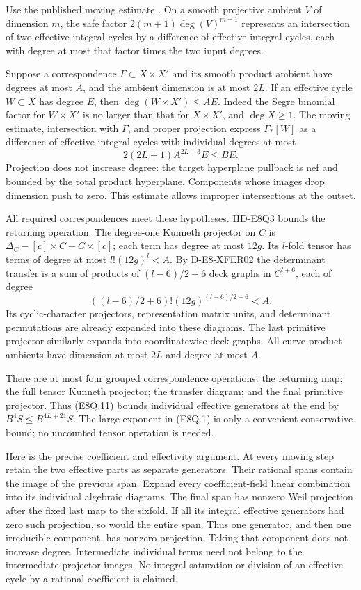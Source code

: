 Use the published moving estimate
\cite[Lemma~2.2, author-version p.~13]{Truong2020}.
On a smooth projective ambient \(V\) of dimension \(m\),
the safe factor \(2(m+1)\deg(V)^{m+1}\) represents an
intersection of two effective integral cycles by a
difference of effective integral cycles, each with degree
at most that factor times the two input degrees.

Suppose a correspondence \(\Gamma\subset X\times X'\)
and its smooth product ambient have degrees at most \(A\),
and the ambient dimension is at most \(2L\). If an effective
cycle \(W\subset X\) has degree \(E\), then
\(\deg(W\times X')\le AE\). Indeed the Segre binomial
factor for \(W\times X'\) is no larger than that for
\(X\times X'\), and \(\deg X\ge1\).
The moving estimate, intersection with \(\Gamma\), and
proper projection express \(\Gamma_*[W]\) as a difference
of effective integral cycles with individual degrees at most
\[
                  2(2L+1)A^{2L+3}E\le BE.                   \tag{E8Q.11}
\]
Projection does not increase degree: the target hyperplane
pullback is nef and bounded by the total product hyperplane.
Components whose images drop dimension push to zero.
This estimate allows improper intersections at the outset.

All required correspondences meet these hypotheses.
HD-E8Q3 bounds the returning operation. The degree-one
Kunneth projector on \(C\) is
\(\Delta_C-[c]\times C-C\times[c]\); each term has degree
at most \(12g\). Its \(l\)-fold tensor has terms of degree
at most \(l!(12g)^l<A\).
By D-E8-XFER02 the determinant transfer is a sum of products
of \((l-6)/2+6\) deck graphs in \(C^{l+6}\), each of degree
\[
           ((l-6)/2+6)!(12g)^{(l-6)/2+6}<A.                  \tag{E8Q.12}
\]
Its cyclic-character projectors, representation matrix units,
and determinant permutations are already expanded into these
diagrams. The last primitive projector similarly expands
into coordinatewise deck graphs. All curve-product ambients
have dimension at most \(2L\) and degree at most \(A\).

There are at most four grouped correspondence operations:
the returning map; the full tensor Kunneth projector; the
transfer diagram; and the final primitive projector.
Thus (E8Q.11) bounds individual effective generators at
the end by \(B^4S\le B^{4L+21}S\).
The large exponent in (E8Q.1) is only a convenient
conservative bound; no uncounted tensor operation is needed.

Here is the precise coefficient and effectivity argument.
At every moving step retain the two effective parts as
separate generators. Their rational spans contain the
image of the previous span. Expand every coefficient-field
linear combination into its individual algebraic diagrams.
The final span has nonzero Weil projection after the fixed
last map to the sixfold. If all its integral effective
generators had zero such projection, so would the entire
span. Thus one generator, and then one irreducible component,
has nonzero projection. Taking that component does not
increase degree. Intermediate individual terms need not
belong to the intermediate projector images.
No integral saturation or division of an effective cycle
by a rational coefficient is claimed.

